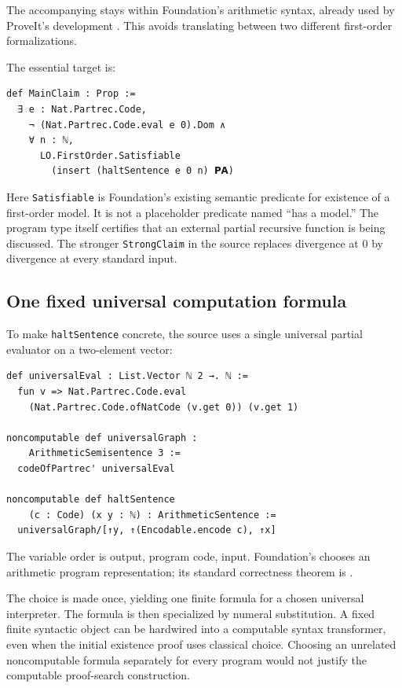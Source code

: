 \documentclass[11pt]{article}
\theoremstyle{definition}
\theoremstyle{remark}
\begin{document}
The accompanying  stays within Foundation's
arithmetic syntax, already used by ProveIt's 
development \cite{PAUndecidable}. This avoids translating between two
different first-order formalizations.

The essential target is:
\begin{lstlisting}
def MainClaim : Prop :=
  ∃ e : Nat.Partrec.Code,
    ¬ (Nat.Partrec.Code.eval e 0).Dom ∧
    ∀ n : ℕ,
      LO.FirstOrder.Satisfiable
        (insert (haltSentence e 0 n) 𝗣𝗔)
\end{lstlisting}
Here \texttt{Satisfiable} is Foundation's existing semantic predicate for
existence of a first-order model. It is not a placeholder predicate named
``has a model.'' The program type itself certifies that an external
partial recursive function is being discussed. The stronger
\texttt{StrongClaim} in the source replaces divergence at $0$ by
divergence at every standard input.

\subsection{One fixed universal computation formula}

To make \texttt{haltSentence} concrete, the source uses a single universal
partial evaluator on a two-element vector:
\begin{lstlisting}
def universalEval : List.Vector ℕ 2 →. ℕ :=
  fun v => Nat.Partrec.Code.eval
    (Nat.Partrec.Code.ofNatCode (v.get 0)) (v.get 1)

noncomputable def universalGraph :
    ArithmeticSemisentence 3 :=
  codeOfPartrec' universalEval

noncomputable def haltSentence
    (c : Code) (x y : ℕ) : ArithmeticSentence :=
  universalGraph/[↑y, ↑(Encodable.encode c), ↑x]
\end{lstlisting}
The variable order is output, program code, input. Foundation's
 chooses an arithmetic program representation; its
standard correctness theorem is 
\cite{FoundationRepresentation}.

The choice is made once, yielding one finite formula for a chosen
universal interpreter. The formula is then specialized by numeral
substitution. A fixed finite syntactic object can be hardwired into a
computable syntax transformer, even when the initial existence proof
uses classical choice. Choosing an unrelated noncomputable formula
separately for every program would not justify the computable
proof-search construction.
\end{document}
